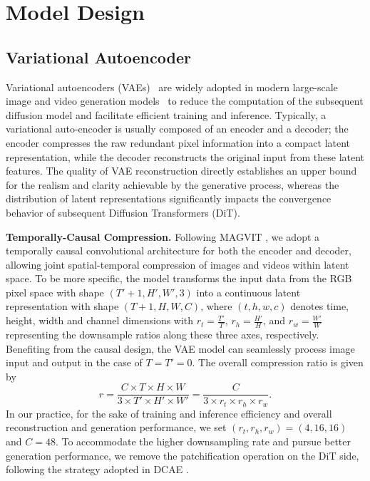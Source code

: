 \section{Model Design}

\subsection{Variational Autoencoder}
Variational autoencoders (VAEs)~\citep{Kingma2013AutoEncodingVB} are widely adopted in modern large-scale image and video generation models~\citep{rombach2022high} to reduce the computation of the subsequent diffusion model and facilitate efficient training and inference. Typically, a variational auto-encoder is usually composed of an encoder and a decoder; the encoder compresses the raw redundant pixel information into a compact latent representation, while the decoder reconstructs the original input from these latent features. The quality of VAE reconstruction directly establishes an upper bound for the realism and clarity achievable by the generative process, whereas the distribution of latent representations significantly impacts the convergence behavior of subsequent Diffusion Transformers (DiT). 

\textbf{Temporally-Causal Compression.} Following MAGVIT \cite{yu2023language}, we adopt a temporally causal convolutional architecture for both the encoder and decoder, allowing joint spatial-temporal compression of images and videos within latent space. To be more specific, the model transforms the input data from the RGB pixel space with shape $(T'+1, H', W', 3)$ into a continuous latent representation with shape $(T+1, H, W, C)$, where $(t, h, w, c)$ denotes time, height, width and channel dimensions with $r_t = \frac{T'}{T}$, $r_h = \frac{H'}{H}$, and $r_w = \frac{W'}{W}$ representing the downsample ratios along these three axes, respectively. Benefiting from the causal design, the VAE model can seamlessly process image input and output in the case of $T=T'=0$. The overall compression ratio is given by
\begin{equation}
    r = \frac{C \times T \times H \times W}{3 \times T' \times H' \times W'} = \frac{C}{3 \times r_t \times r_h \times r_w}.
    \label{equa:compression_ratio}
\end{equation}
In our practice, for the sake of training and inference efficiency and overall reconstruction and generation performance, we set $(r_t, r_h, r_w) = (4,16,16)$ and $C=48$. To accommodate the higher downsampling rate and pursue better generation performance, we remove the patchification operation on the DiT side, following the strategy adopted in DCAE \cite{chen2024deep}.

